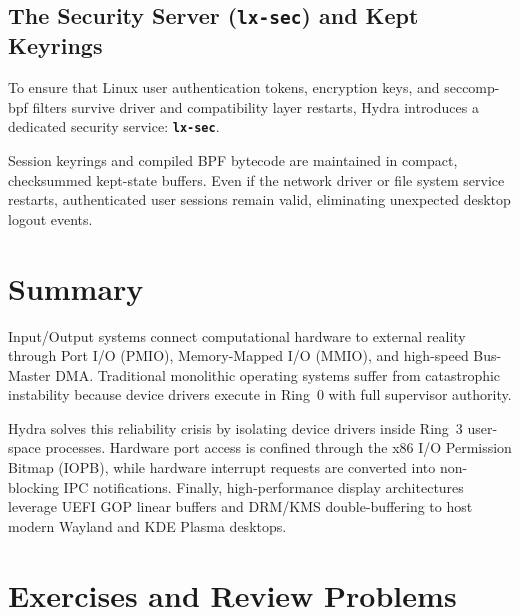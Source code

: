 \subsection{The Security Server (\texttt{lx-sec}) and Kept Keyrings}
To ensure that Linux user authentication tokens, encryption keys, and seccomp-bpf filters survive driver and compatibility layer restarts, Hydra introduces a dedicated security service: \textbf{\texttt{lx-sec}}. 

Session keyrings and compiled BPF bytecode are maintained in compact, checksummed kept-state buffers. Even if the network driver or file system service restarts, authenticated user sessions remain valid, eliminating unexpected desktop logout events.

\section{Summary}
\label{sec:summary_chap5}

Input/Output systems connect computational hardware to external reality through Port I/O (PMIO), Memory-Mapped I/O (MMIO), and high-speed Bus-Master DMA. Traditional monolithic operating systems suffer from catastrophic instability because device drivers execute in Ring~0 with full supervisor authority.

Hydra solves this reliability crisis by isolating device drivers inside Ring~3 user-space processes. Hardware port access is confined through the x86 I/O Permission Bitmap (IOPB), while hardware interrupt requests are converted into non-blocking IPC notifications. Finally, high-performance display architectures leverage UEFI GOP linear buffers and DRM/KMS double-buffering to host modern Wayland and KDE Plasma desktops.

\section{Exercises and Review Problems}
\label{sec:exercises_chap5}

